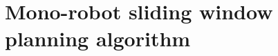 \documentclass[eprint]{actapoly}
\begin{document}


%
%
%
%
%
%
%
%


\section{Mono-robot sliding window planning algorithm}
\end{document}

